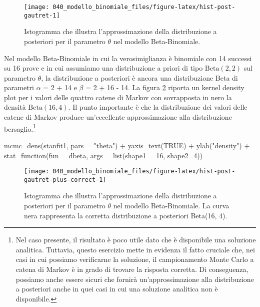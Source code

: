 \documentclass[
]{memoir}
\newenvironment{Shaded}{\begin{snugshade}}{\end{snugshade}}
\newcommand{\AttributeTok}[1]{\textcolor[rgb]{0.77,0.63,0.00}{#1}}
\newcommand{\ConstantTok}[1]{\textcolor[rgb]{0.00,0.00,0.00}{#1}}
\newcommand{\DecValTok}[1]{\textcolor[rgb]{0.00,0.00,0.81}{#1}}
\newcommand{\FunctionTok}[1]{\textcolor[rgb]{0.00,0.00,0.00}{#1}}
\newcommand{\NormalTok}[1]{#1}
\newcommand{\SpecialCharTok}[1]{\textcolor[rgb]{0.00,0.00,0.00}{#1}}
\newcommand{\StringTok}[1]{\textcolor[rgb]{0.31,0.60,0.02}{#1}}
\begin{document}
\begin{figure}

{\centering \texttt{[image: 040\_modello\_binomiale\_files/figure-latex/hist-post-gautret-1]} 

}

\caption{Istogramma che illustra l'approssimazione della distribuzione a posteriori per il parametro $\theta$ nel modello Beta-Binomiale.}\label{fig:hist-post-gautret}
\end{figure}

Nel modello Beta-Binomiale in cui la verosimiglianza è binomiale con 14 successi su 16 prove e in cui assumiamo una distribuzione a priori di tipo \(\mbox{Beta}(2, 2)\) sul parametro \(\theta\), la distribuzione a posteriori è ancora una distribuzione Beta di parametri \(\alpha\) = 2 + 14 e \(\beta\) = 2 + 16 - 14. La figura \ref{fig:hist-post-gautret-plus-correct} riporta un kernel density plot per i valori delle quattro catene di Markov con sovrapposta in nero la densità \(\mbox{Beta}(16, 4)\). Il punto importante è che la distribuzione dei valori delle catene di Markov produce un'eccellente approssimazione alla distribuzione bersaglio.\footnote{Nel caso presente, il risultato è poco utile dato che è disponibile una soluzione analitica. Tuttavia, questo esercizio mette in evidenza il fatto cruciale che, nei casi in cui possiamo verificarne la soluzione, il campionamento Monte Carlo a catena di Markov è in grado di trovare la risposta corretta. Di conseguenza, possiamo anche essere sicuri che fornirà un'approssimazione alla distribuzione a posteriori anche in quei casi in cui una soluzione analitica non è disponibile.}

\begin{Shaded}
\begin{Highlighting}[]
\FunctionTok{mcmc\_dens}\NormalTok{(stanfit1, }\AttributeTok{pars =} \StringTok{"theta"}\NormalTok{) }\SpecialCharTok{+} 
  \FunctionTok{yaxis\_text}\NormalTok{(}\ConstantTok{TRUE}\NormalTok{) }\SpecialCharTok{+} 
  \FunctionTok{ylab}\NormalTok{(}\StringTok{"density"}\NormalTok{) }\SpecialCharTok{+}
  \FunctionTok{stat\_function}\NormalTok{(}\AttributeTok{fun =}\NormalTok{ dbeta, }\AttributeTok{args =} \FunctionTok{list}\NormalTok{(}\AttributeTok{shape1 =} \DecValTok{16}\NormalTok{, }\AttributeTok{shape2=}\DecValTok{4}\NormalTok{))}
\end{Highlighting}
\end{Shaded}

\begin{figure}

{\centering \texttt{[image: 040\_modello\_binomiale\_files/figure-latex/hist-post-gautret-plus-correct-1]} 

}

\caption{Istogramma che illustra l'approssimazione della distribuzione a posteriori per il parametro $\theta$ nel modello Beta-Binomiale. La curva nera rappresenta la corretta distribuzione a posteriori Beta(16, 4).}\label{fig:hist-post-gautret-plus-correct}
\end{figure}
\end{document}
